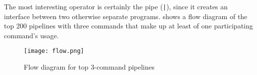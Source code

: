 
The most interesting operator is certainly the pipe (\verb!|!), since it creates an interface between two otherwise separate programs.
 shows a flow diagram of the top 200 pipelines with three commands that make up at least  of one participating command's usage.

\begin{figure*}[h]
	\centering    
	\texttt{[image: flow.png]}
	\caption{Flow diagram for top 3-command pipelines}
	\label{fig:flow}
\end{figure*}
